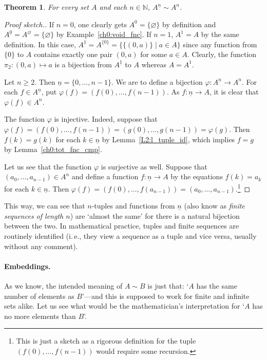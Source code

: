 \documentclass[12pt,notitlepage]{article}
\theoremstyle{plain}
\newtheorem{thm}{Theorem}[section]
\theoremstyle{definition}
\theoremstyle{plain}
\newcommand{\N}{\mathbb{N}}
\newcommand{\void}{\varnothing}
\renewcommand{\phi}{\varphi}
\newcommand{\ul}[1]{\underline{#1}}
\newcommand{\1}{\mathbf{1}}
\newcommand{\0}{\mathbf{0}}
\newcommand{\mcomm}[1]{}
\begin{document}
\mcomm{This easy theorem proves handy when formalizing combinatorial arguments; it is thus unwise to skip it.}
\begin{thm}\label{L9:t_tuples}
For every set $A$ and each $n \in \N$, $A^{\ul{n}} \sim A^n$.
\end{thm}
\begin{proof}[Proof sketch.]
If $n = 0$, one clearly gets $A^0 = \{ \void \}$ by definition and $A^{\ul{0}} = A^\void = \{ \void \}$ by Example~\ref{ch0:void_fnc}. If $n = 1$, $A^1 = A$ by the same definition. In this case, $A^{\ul{1}} = A^{\{0\}} = \{ \{ (0, a) \} \mid a \in A\}$ since any function from $\{ 0 \}$ to $A$ contains exactly one pair $(0, a)$ for some $a \in A$. Clearly, the function $\pi_2 \colon (0, a) \mapsto a$ is a bijection from $A^{\ul{1}}$ to $A$ whereas $A = A^1$.

Let $n \ge 2$. Then $\ul{n} = \{0, \ldots, n-1 \}$. We are to define a bijection $\phi \colon A^{\ul{n}} \to A^n$. For each $f \in A^{\ul{n}}$, put $\phi(f) = (f(0), \ldots, f(n - 1))$. As $f\colon \ul{n} \to A$, it is clear that $\phi(f) \in A^n$. 

The function $\phi$ is injective. Indeed, suppose that $\phi(f) = (f(0), \ldots, f(n - 1)) = (g(0), \ldots, g(n - 1)) = \phi(g)$. Then $f(k) = g(k)$ for each $k \in \ul{n}$ by Lemma~\ref{L2:l_tuple_id}, which implies $f = g$ by Lemma~\ref{ch0:tot_fnc_cmp}.

Let us see that the function $\phi$ is surjective as well. Suppose that $(a_0, \ldots, a_{n-1}) \in A^n$ and define a function $f\colon \ul{n} \to A$ by the equations $f(k) = a_k$ for each $k \in \ul{n}$. Then $\phi(f) = (f(0), \ldots, f(a_{n-1})) = (a_0, \ldots, a_{n-1})$.\footnote{This is just a sketch as a rigorous definition for the tuple $(f(0),\ldots,f(n-1))$ would require some recursion.}
\end{proof}

This way, we can see that $n$-tuples and functions from $\ul{n}$ (also know as \emph{finite sequences of length $n$}) are `almost the same' for there is a natural bijection between the two. In mathematical practice, tuples and finite sequences are routinely identified (i.\,e., they view a sequence as a tuple and vice versa, usually without any comment).

\paragraph{Embeddings.} As we know, the intended meaning of $A \sim B$ is just that: `$A$ has the same number of elements as $B$'---and this is supposed to work for finite and infinite sets alike. Let us see what would be the mathematician's interpretation for `$A$ has no more elements than $B$'.
\end{document}
